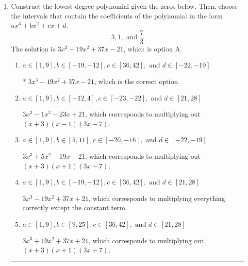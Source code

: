 \documentclass{extbook}[14pt]
\newcommand{\litem}[1]{\item #1

\rule{\textwidth}{0.4pt}}
\begin{document}
\begin{enumerate}\litem{
Construct the lowest-degree polynomial given the zeros below. Then, choose the intervals that contain the coefficients of the polynomial in the form $ax^3+bx^2+cx+d$.
\[ 3, 1, \text{ and } \frac{7}{3} \]The solution is \( 3x^{3} -19 x^{2} +37 x -21 \), which is option A.\begin{enumerate}[label=\Alph*.]
\item \( a \in [1, 9], b \in [-19, -12], c \in [36, 42], \text{ and } d \in [-22, -19] \)

* $3x^{3} -19 x^{2} +37 x -21$, which is the correct option.
\item \( a \in [1, 9], b \in [-12, 4], c \in [-23, -22], \text{ and } d \in [21, 28] \)

$3x^{3} -1 x^{2} -23 x + 21$, which corresponds to multiplying out $(x + 3)(x -1)(3x -7)$.
\item \( a \in [1, 9], b \in [5, 11], c \in [-20, -16], \text{ and } d \in [-22, -19] \)

$3x^{3} +5 x^{2} -19 x -21$, which corresponds to multiplying out $(x + 3)(x + 1)(3x -7)$.
\item \( a \in [1, 9], b \in [-19, -12], c \in [36, 42], \text{ and } d \in [21, 28] \)

$3x^{3} -19 x^{2} +37 x + 21$, which corresponds to multiplying everything correctly except the constant term.
\item \( a \in [1, 9], b \in [9, 25], c \in [36, 42], \text{ and } d \in [21, 28] \)

$3x^{3} +19 x^{2} +37 x + 21$, which corresponds to multiplying out $(x + 3)(x + 1)(3x + 7)$.
\end{enumerate}

}
\end{enumerate}
\end{document}

